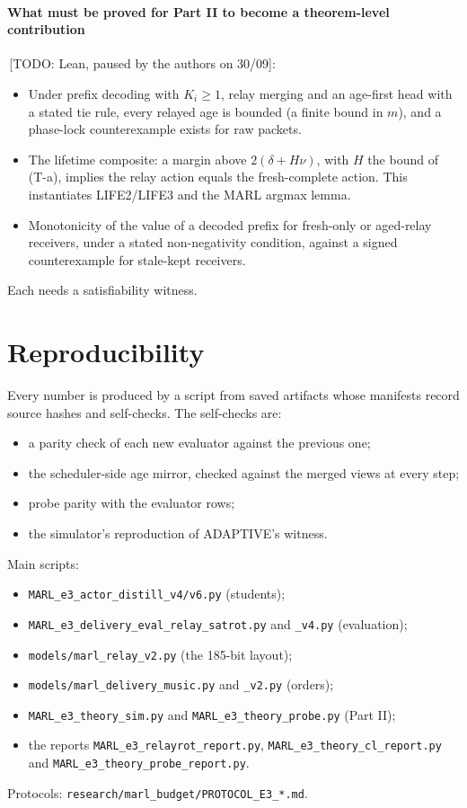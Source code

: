 \documentclass[11pt]{article}
\theoremstyle{definition}
\newif\ifshownotes\shownotestrue
\newcommand{\TODO}[1]{\ifshownotes{\color{todocol}\,\textsf{\footnotesize[TODO: #1]}}\fi}
\begin{document}
\paragraph{What must be proved for Part II to become a theorem-level contribution} \TODO{Lean, paused by the authors on
30/09}:
\begin{itemize}
\item[(T-a)] Under prefix decoding with $K_i\ge1$, relay merging and an age-first head with a stated tie rule, every
relayed age is bounded (a finite bound in $m$), and a phase-lock counterexample exists for raw packets.
\item[(T-b)] The lifetime composite: a margin above $2(\delta+H\nu)$, with $H$ the bound of (T-a), implies the relay action
equals the fresh-complete action. This instantiates LIFE2/LIFE3 and the MARL argmax lemma.
\item[(T-c)] Monotonicity of the value of a decoded prefix for fresh-only or aged-relay receivers, under a stated
non-negativity condition, against a signed counterexample for stale-kept receivers.
\end{itemize}
Each needs a satisfiability witness.

\section{Reproducibility}
Every number is produced by a script from saved artifacts whose manifests record source hashes and self-checks. The
self-checks are:
\begin{itemize}
\item a parity check of each new evaluator against the previous one;
\item the scheduler-side age mirror, checked against the merged views at every step;
\item probe parity with the evaluator rows;
\item the simulator's reproduction of ADAPTIVE's witness.
\end{itemize}
Main scripts:
\begin{itemize}
\item \texttt{MARL\_e3\_actor\_distill\_v4/v6.py} (students);
\item \texttt{MARL\_e3\_delivery\_eval\_relay\_satrot.py} and \texttt{\_v4.py} (evaluation);
\item \texttt{models/marl\_relay\_v2.py} (the 185-bit layout);
\item \texttt{models/marl\_delivery\_music.py} and \texttt{\_v2.py} (orders);
\item \texttt{MARL\_e3\_theory\_sim.py} and \texttt{MARL\_e3\_theory\_probe.py} (Part II);
\item the reports \texttt{MARL\_e3\_relayrot\_report.py}, \texttt{MARL\_e3\_theory\_cl\_report.py} and
\texttt{MARL\_e3\_theory\_probe\_report.py}.
\end{itemize}
Protocols: \texttt{research/marl\_budget/PROTOCOL\_E3\_*.md}.
\end{document}
